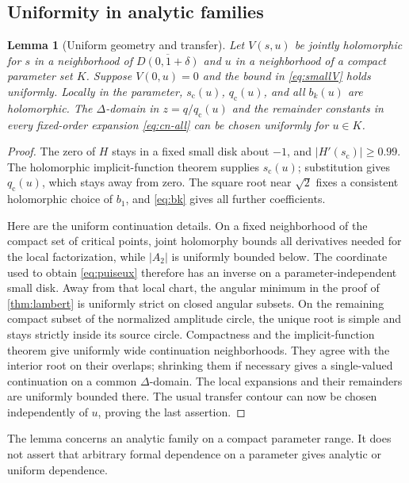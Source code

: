 \documentclass[11pt,a4paper]{article}
\numberwithin{equation}{section}
\newtheorem{lemma}[lemma]{Lemma}
\theoremstyle{definition}
\theoremstyle{remark}
\newcommand{\scv}{s_{\mathrm c}}
\newcommand{\qcv}{q_{\mathrm c}}
\begin{document}
\subsection{Uniformity in analytic families}
\begin{lemma}[Uniform geometry and transfer]
\label{lem:uniform}
Let $V(s,u)$ be jointly holomorphic for $s$ in a neighborhood of $\overline{D(0,1+\delta)}$ and $u$ in a neighborhood of a compact parameter set $K$. Suppose $V(0,u)=0$ and the bound in \eqref{eq:smallV} holds uniformly. Locally in the parameter, $\scv(u)$, $\qcv(u)$, and all $b_k(u)$ are holomorphic. The $\Delta$-domain in $z=q/\qcv(u)$ and the remainder constants in every fixed-order expansion \eqref{eq:cn-all} can be chosen uniformly for $u\in K$.
\end{lemma}
\begin{proof}
The zero of $H$ stays in a fixed small disk about $-1$, and $|H'(\scv)|\geq0.99$. The holomorphic implicit-function theorem supplies $\scv(u)$; substitution gives $\qcv(u)$, which stays away from zero. The square root near $\sqrt2$ fixes a consistent holomorphic choice of $b_1$, and \eqref{eq:bk} gives all further coefficients.

Here are the uniform continuation details. On a fixed neighborhood of the compact set of critical points, joint holomorphy bounds all derivatives needed for the local factorization, while $|A_2|$ is uniformly bounded below. The coordinate used to obtain \eqref{eq:puiseux} therefore has an inverse on a parameter-independent small disk. Away from that local chart, the angular minimum in the proof of \cref{thm:lambert} is uniformly strict on closed angular subsets. On the remaining compact subset of the normalized amplitude circle, the unique root is simple and stays strictly inside its source circle. Compactness and the implicit-function theorem give uniformly wide continuation neighborhoods. They agree with the interior root on their overlaps; shrinking them if necessary gives a single-valued continuation on a common $\Delta$-domain. The local expansions and their remainders are uniformly bounded there. The usual transfer contour can now be chosen independently of $u$, proving the last assertion.
\end{proof}

The lemma concerns an analytic family on a compact parameter range. It does not assert that arbitrary formal dependence on a parameter gives analytic or uniform dependence.
\end{document}
